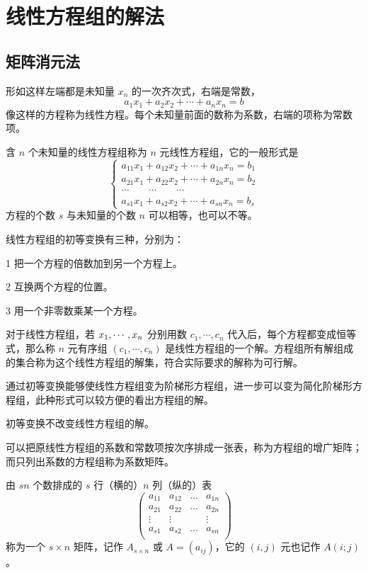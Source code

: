 \chapter{线性方程组的解法}

\section{矩阵消元法}

形如这样左端都是未知量 $x_n$ 的一次齐次式，右端是常数，
\[a_1x_1+a_2x_2+\cdots+a_nx_n=b\]
像这样的方程称为线性方程。每个未知量前面的数称为系数，右端的项称为常数项。

含 $n$ 个未知量的线性方程组称为 $n$ 元线性方程组，它的一般形式是
\begin{equation*}
	\left\{
		\begin{matrix}
			a_{11}x_1+a_{12}x_2+\cdots+a_{1n}x_n=b_1\\
			a_{21}x_1+a_{22}x_2+\cdots+a_{2n}x_n=b_2\\
			\cdots\qquad\cdots\qquad\cdots\\
			a_{s1}x_1+a_{s2}x_2+\cdots+a_{sn}x_n=b_s
		\end{matrix}
	\right.
\end{equation*}
方程的个数 $s$ 与未知量的个数 $n$ 可以相等，也可以不等。

\begin{definition}[线性方程组的初等变换]
	线性方程组的初等变换有三种，分别为：
	
	\num{1} 把一个方程的倍数加到另一个方程上。

	\num{2} 互换两个方程的位置。

	\num{3} 用一个非零数乘某一个方程。
\end{definition}

对于线性方程组，若 $x_1,\cdots,x_n$ 分别用数 $c_1,\cdots,c_n$ 代入后，每个方程都变成恒等式，那么称 $n$ 元有序组 $(c_1,\cdots,c_n)$ 是线性方程组的一个解。方程组所有解组成的集合称为这个线性方程组的解集，符合实际要求的解称为可行解。

通过初等变换能够使线性方程组变为阶梯形方程组，进一步可以变为简化阶梯形方程组，此种形式可以较方便的看出方程组的解。

\begin{theorem}
	初等变换不改变线性方程组的解。
\end{theorem}

可以把原线性方程组的系数和常数项按次序排成一张表，称为方程组的增广矩阵；而只列出系数的方程组称为系数矩阵。

\begin{definition}
	由 $sn$ 个数排成的 $s$ 行（横的）$n$ 列（纵的）表
	\begin{equation*}
		\left(
			\begin{matrix}
				a_{11}&a_{12}&\ldots&a_{1n}\\
				a_{21}&a_{22}&\ldots&a_{2n}\\
				\vdots&\vdots&&\vdots\\a_{s1}&a_{s2}&\ldots&a_{sn}\\
			\end{matrix}
		\right)
	\end{equation*}
	称为一个 $s\times n$ 矩阵，记作 $A_{s\times n}$ 或 $A=(a_{ij})$，它的 $(i,j)$ 元也记作 $A(i;j)$。
\end{definition}

